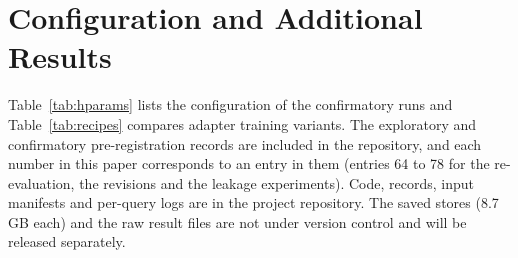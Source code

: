 \documentclass[journal,10pt]{IEEEtran}
\begin{document}
\appendices
\section{Configuration and Additional Results}
\label{sec:appendix}

Table~\ref{tab:hparams} lists the configuration of the confirmatory runs and
Table~\ref{tab:recipes} compares adapter training variants. The exploratory and
confirmatory pre-registration records are included in the repository, and each number
in this paper corresponds to an entry in them (entries 64 to 78 for the re-evaluation, the
revisions and the leakage experiments). Code, records, input manifests and per-query logs are in the project
repository. The saved stores (8.7\,GB each) and the raw result files are not under
version control and will be released separately.






\end{document}
